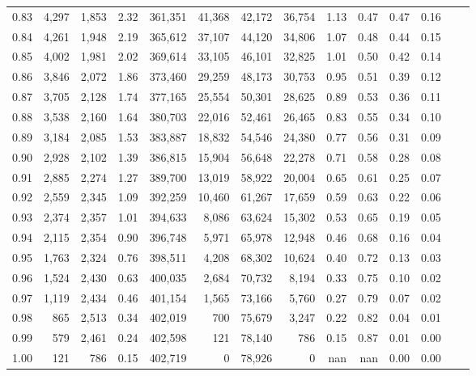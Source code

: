 \begin{tabular}{rrrrrrrrrrrrrr}
0.83 &  4,297 &  1,853 &     2.32 &  361,351 &   41,368 &  42,172 &  36,754 &  1.13 &  0.47 &  0.47 &      0.16 \\
0.84 &  4,261 &  1,948 &     2.19 &  365,612 &   37,107 &  44,120 &  34,806 &  1.07 &  0.48 &  0.44 &      0.15 \\
0.85 &  4,002 &  1,981 &     2.02 &  369,614 &   33,105 &  46,101 &  32,825 &  1.01 &  0.50 &  0.42 &      0.14 \\
0.86 &  3,846 &  2,072 &     1.86 &  373,460 &   29,259 &  48,173 &  30,753 &  0.95 &  0.51 &  0.39 &      0.12 \\
0.87 &  3,705 &  2,128 &     1.74 &  377,165 &   25,554 &  50,301 &  28,625 &  0.89 &  0.53 &  0.36 &      0.11 \\
0.88 &  3,538 &  2,160 &     1.64 &  380,703 &   22,016 &  52,461 &  26,465 &  0.83 &  0.55 &  0.34 &      0.10 \\
0.89 &  3,184 &  2,085 &     1.53 &  383,887 &   18,832 &  54,546 &  24,380 &  0.77 &  0.56 &  0.31 &      0.09 \\
0.90 &  2,928 &  2,102 &     1.39 &  386,815 &   15,904 &  56,648 &  22,278 &  0.71 &  0.58 &  0.28 &      0.08 \\
0.91 &  2,885 &  2,274 &     1.27 &  389,700 &   13,019 &  58,922 &  20,004 &  0.65 &  0.61 &  0.25 &      0.07 \\
0.92 &  2,559 &  2,345 &     1.09 &  392,259 &   10,460 &  61,267 &  17,659 &  0.59 &  0.63 &  0.22 &      0.06 \\
0.93 &  2,374 &  2,357 &     1.01 &  394,633 &    8,086 &  63,624 &  15,302 &  0.53 &  0.65 &  0.19 &      0.05 \\
0.94 &  2,115 &  2,354 &     0.90 &  396,748 &    5,971 &  65,978 &  12,948 &  0.46 &  0.68 &  0.16 &      0.04 \\
0.95 &  1,763 &  2,324 &     0.76 &  398,511 &    4,208 &  68,302 &  10,624 &  0.40 &  0.72 &  0.13 &      0.03 \\
0.96 &  1,524 &  2,430 &     0.63 &  400,035 &    2,684 &  70,732 &   8,194 &  0.33 &  0.75 &  0.10 &      0.02 \\
0.97 &  1,119 &  2,434 &     0.46 &  401,154 &    1,565 &  73,166 &   5,760 &  0.27 &  0.79 &  0.07 &      0.02 \\
0.98 &    865 &  2,513 &     0.34 &  402,019 &      700 &  75,679 &   3,247 &  0.22 &  0.82 &  0.04 &      0.01 \\
0.99 &    579 &  2,461 &     0.24 &  402,598 &      121 &  78,140 &     786 &  0.15 &  0.87 &  0.01 &      0.00 \\
1.00 &    121 &    786 &     0.15 &  402,719 &        0 &  78,926 &       0 &   nan &   nan &  0.00 &      0.00 \\
\bottomrule
\end{tabular}
